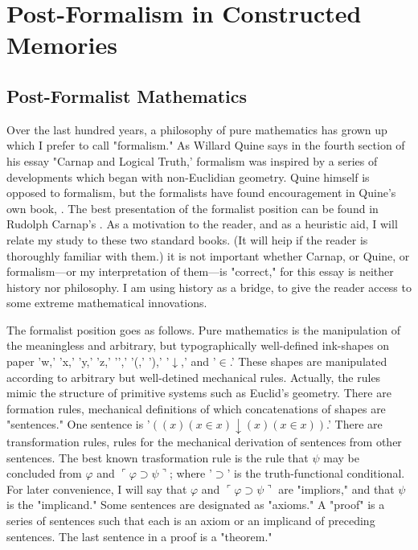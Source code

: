 \chapter{Post-Formalism in Constructed Memories}
\section{Post-Formalist Mathematics}

Over the last hundred years, a philosophy of pure mathematics has 
grown up which I prefer to call "formalism." As Willard Quine says in the 
fourth section of his essay "Carnap and Logical Truth,' formalism was 
inspired by a series of developments which began with non-Euclidian 
geometry. Quine himself is opposed to formalism, but the formalists have 
found encouragement in Quine's own book, . The best 
presentation of the formalist position can be found in Rudolph Carnap's 
. As a motivation to the reader, and 
as a heuristic aid, I will relate my study to these two standard books. (It will 
heip if the reader is thoroughly familiar with them.) it is not important 
whether Carnap, or Quine, or formalism---or my interpretation of them---is 
"correct," for this essay is neither history nor philosophy. I am using history 
as a bridge, to give the reader access to some extreme mathematical 
innovations. 

The formalist position goes as follows. Pure mathematics is the 
manipulation of the meaningless and arbitrary, but typographically 
well-defined ink-shapes on paper 'w,' 'x,' 'y,' 'z,' '{}',' '(,' '),' '$\downarrow$,' and '$\in$.' 
These shapes are manipulated according to arbitrary but well-detined 
mechanical rules. Actually, the rules mimic the structure of primitive 
systems such as Euclid's geometry. There are formation rules, mechanical 
definitions of which concatenations of shapes are "sentences." One sentence 
is '$((x) (x\in x) \downarrow (x) (x\in x))$.' There are transformation rules, rules for the 
mechanical derivation of sentences from other sentences. The best known 
trasformation rule is the rule that $\psi$ may be concluded from $\varphi$ and 
$\ulcorner \varphi \supset \psi \urcorner$; 
where '$\supset$' is the truth-functional conditional. For later convenience, I will 
say that $\varphi$ and $\ulcorner \varphi \supset \psi \urcorner$ are "impliors," 
and that $\psi$ is the "implicand." 
Some sentences are designated as "axioms." A "proof" is a series of 
sentences such that each is an axiom or an implicand of preceding sentences. 
The last sentence in a proof is a "theorem." 

